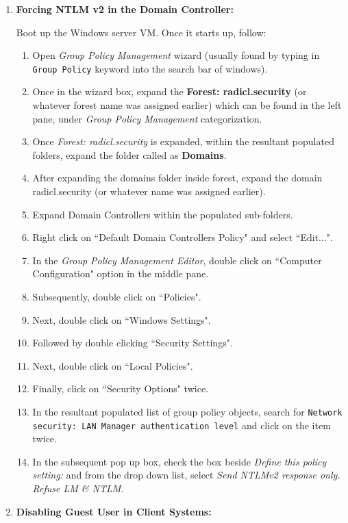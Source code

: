 \documentclass[12pt]{extarticle}
\begin{document}
\begin{enumerate}
	\item \textbf{Forcing NTLM v2 in the Domain Controller:}
	
	Boot up the Windows server VM. Once it starts up, follow:
	
	\begin{enumerate}
		\item Open \textit{Group Policy Management} wizard (usually found by typing in \texttt{Group Policy} keyword into the search bar of windows).
		\item Once in the wizard box, expand the \textbf{Forest: radicl.security} (or whatever forest name was assigned earlier) which can be found in the left pane, under \textit{Group Policy Management} categorization.
		\item Once \textit{Forest: radicl.security} is expanded, within the resultant populated folders, expand the folder called as \textbf{Domains}.
		\item After expanding the domains folder inside forest, expand the domain radicl.security (or whatever name was assigned earlier).
		\item Expand Domain Controllers within the populated sub-folders.
		\item Right click on ``Default Domain Controllers Policy" and select ``Edit...".
		\item In the \textit{Group Policy Management Editor}, double click on ``Computer Configuration" option in the middle pane.
		\item Subsequently, double click on ``Policies".
		\item Next, double click on ``Windows Settings".
		\item Followed by double clicking ``Security Settings".
		\item Next, double click on ``Local Policies".
		\item Finally, click on ``Security Options" twice.
		\item In the resultant populated list of group policy objects, search for \texttt{Network security: LAN Manager authentication level} and click on the item twice.
		\item In the subsequent pop up box, check the box beside \textit{Define this policy setting:} and from the drop down list, select \textit{Send NTLMv2 response only. Refuse LM \& NTLM}. 
	\end{enumerate}
	
	
	
	\item \textbf{Disabling Guest User in Client Systems:}
	

\end{enumerate}
\end{document}
